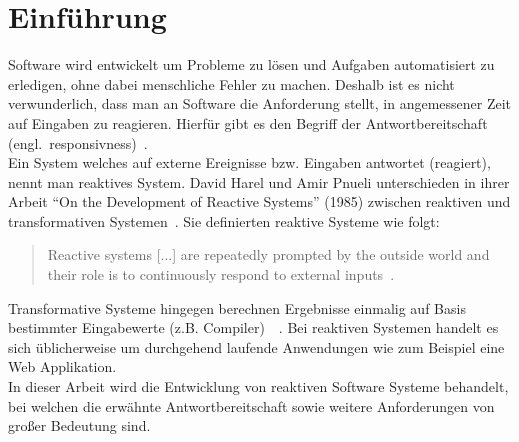 \chapter{Einführung}\label{sec:einfuehrung}
Software wird entwickelt um Probleme zu lösen und Aufgaben automatisiert zu erledigen, ohne dabei menschliche Fehler zu machen. Deshalb ist es nicht verwunderlich, dass man an Software die Anforderung stellt, in angemessener Zeit auf Eingaben zu reagieren. Hierfür gibt es den Begriff der Antwortbereitschaft (engl.\ responsivness)~\cite[S.~18]{kuhn_reactive_2015}.\\
Ein System welches auf externe Ereignisse bzw. Eingaben antwortet (reagiert), nennt man reaktives System. David Harel und Amir Pnueli unterschieden in ihrer Arbeit \enquote{On the Development of Reactive Systems} (1985) zwischen reaktiven und transformativen Systemen~\cite{harel_development_1985}. Sie definierten reaktive Systeme wie folgt:

\begin{quotation}
  Reactive systems [...] are repeatedly prompted by the outside world and their role is to continuously respond to external inputs~\cite{harel_development_1985}.
\end{quotation}

Transformative Systeme hingegen berechnen Ergebnisse einmalig auf Basis bestimmter Eingabewerte (z.B. Compiler)~\cite[S.~2]{carkci_dataflow_2014}~\cite{wieringa_design_2003}. Bei reaktiven Systemen handelt es sich üblicherweise um durchgehend laufende Anwendungen wie zum Beispiel eine Web Applikation.\\
In dieser Arbeit wird die Entwicklung von reaktiven Software Systeme behandelt, bei welchen die erwähnte Antwortbereitschaft sowie weitere Anforderungen von großer Bedeutung sind.

\pagebreak

